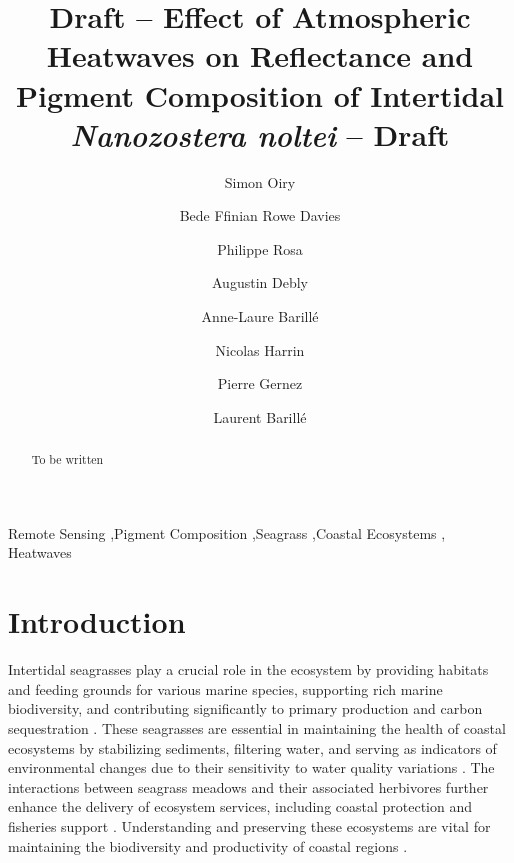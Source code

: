\documentclass[
  number]{elsarticle}
\begin{document}
\begin{frontmatter}
\title{Draft -- Effect of Atmospheric Heatwaves on Reflectance and
Pigment Composition of Intertidal \emph{Nanozostera noltei} -- Draft}
\author[1]{Simon Oiry%
%
}
\author[1]{Bede Ffinian Rowe Davies%
%
}

\author[1]{Philippe Rosa%
%
}

\author[1]{Augustin Debly%
%
}

\author[2]{Anne-Laure Barillé%
%
}

\author[2]{Nicolas Harrin%
%
}

\author[1]{Pierre Gernez%
%
}

\author[1]{Laurent Barillé%
%
}











        
\begin{abstract}
To be written
\end{abstract}





\begin{keyword}
    Remote Sensing \sep Pigment Composition \sep Seagrass \sep Coastal
Ecosystems \sep 
    Heatwaves
\end{keyword}
\end{frontmatter}
    

\section{Introduction}\label{introduction}

Intertidal seagrasses play a crucial role in the ecosystem by providing
habitats and feeding grounds for various marine species, supporting rich
marine biodiversity, and contributing significantly to primary
production and carbon sequestration
\citep{unsworth2022planetary, sousa2019blue}. These seagrasses are
essential in maintaining the health of coastal ecosystems by stabilizing
sediments, filtering water, and serving as indicators of environmental
changes due to their sensitivity to water quality variations
\citep{zoffoli2021decadal}. The interactions between seagrass meadows
and their associated herbivores further enhance the delivery of
ecosystem services, including coastal protection and fisheries support
\citep{jankowska2019stabilizing, zoffoli2023remote, gardner2018global}.
Understanding and preserving these ecosystems are vital for maintaining
the biodiversity and productivity of coastal regions
\citep{scott2018role, ramesh2020seagrass}.
\end{document}
